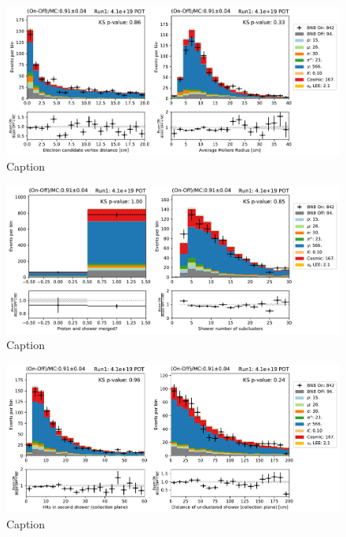 \begin{figure}
    \centering
    \includegraphics[width=\textwidth]{NueCCsel/Images/run1/e_cand_dist.pdf}
    \caption{Caption}
    \label{fig:e_cand_dist}
\end{figure}

\begin{figure}
    \centering
    \includegraphics[width=\textwidth]{NueCCsel/Images/run1/e_cand_subclusters.pdf}
    \caption{Caption}
    \label{fig:e_cand_subclusters}
\end{figure}

\begin{figure}
    \centering
    \includegraphics[width=\textwidth]{NueCCsel/Images/run1/e_cand_secondshower.pdf}
    \caption{Caption}
    \label{fig:e_cand_secondshower}
\end{figure}

